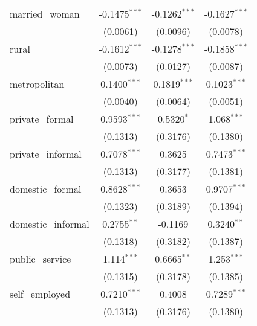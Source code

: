 \begin{tabular}{lccc}
   married\_woman                  & -0.1475$^{***}$         & -0.1262$^{***}$         & -0.1627$^{***}$\\   
                                   & (0.0061)                & (0.0096)                & (0.0078)\\   
   rural                           & -0.1612$^{***}$         & -0.1278$^{***}$         & -0.1858$^{***}$\\   
                                   & (0.0073)                & (0.0127)                & (0.0087)\\   
   metropolitan                    & 0.1400$^{***}$          & 0.1819$^{***}$          & 0.1023$^{***}$\\   
                                   & (0.0040)                & (0.0064)                & (0.0051)\\   
   private\_formal                 & 0.9593$^{***}$          & 0.5320$^{*}$            & 1.068$^{***}$\\   
                                   & (0.1313)                & (0.3176)                & (0.1380)\\   
   private\_informal               & 0.7078$^{***}$          & 0.3625                  & 0.7473$^{***}$\\   
                                   & (0.1313)                & (0.3177)                & (0.1381)\\   
   domestic\_formal                & 0.8628$^{***}$          & 0.3653                  & 0.9707$^{***}$\\   
                                   & (0.1323)                & (0.3189)                & (0.1394)\\   
   domestic\_informal              & 0.2755$^{**}$           & -0.1169                 & 0.3240$^{**}$\\   
                                   & (0.1318)                & (0.3182)                & (0.1387)\\   
   public\_service                 & 1.114$^{***}$           & 0.6665$^{**}$           & 1.253$^{***}$\\   
                                   & (0.1315)                & (0.3178)                & (0.1385)\\   
   self\_employed                  & 0.7210$^{***}$          & 0.4008                  & 0.7289$^{***}$\\   
                                   & (0.1313)                & (0.3176)                & (0.1380)\\   

\end{tabular}
